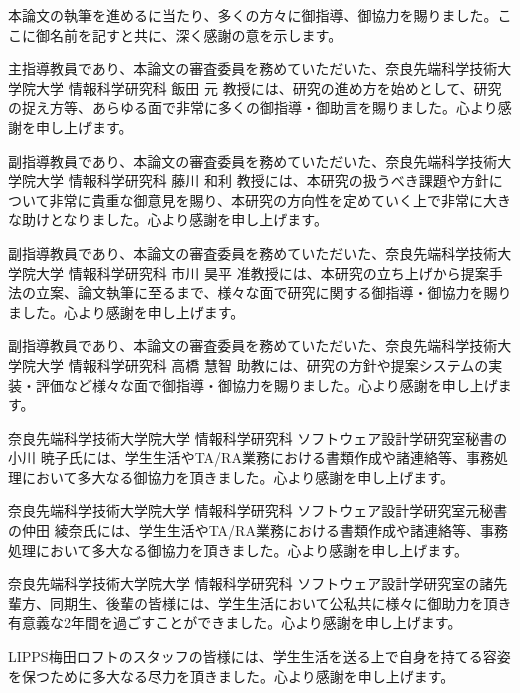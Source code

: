 本論文の執筆を進めるに当たり、多くの方々に御指導、御協力を賜りました。ここに御名前を記すと共に、深く感謝の意を示します。

主指導教員であり、本論文の審査委員を務めていただいた、奈良先端科学技術大学院大学 情報科学研究科 飯田 元 教授には、研究の進め方を始めとして、研究の捉え方等、あらゆる面で非常に多くの御指導・御助言を賜りました。心より感謝を申し上げます。

副指導教員であり、本論文の審査委員を務めていただいた、奈良先端科学技術大学院大学 情報科学研究科 藤川 和利 教授には、本研究の扱うべき課題や方針について非常に貴重な御意見を賜り、本研究の方向性を定めていく上で非常に大きな助けとなりました。心より感謝を申し上げます。

副指導教員であり、本論文の審査委員を務めていただいた、奈良先端科学技術大学院大学 情報科学研究科 市川 昊平 准教授には、本研究の立ち上げから提案手法の立案、論文執筆に至るまで、様々な面で研究に関する御指導・御協力を賜りました。心より感謝を申し上げます。

副指導教員であり、本論文の審査委員を務めていただいた、奈良先端科学技術大学院大学 情報科学研究科 高橋 慧智 助教には、研究の方針や提案システムの実装・評価など様々な面で御指導・御協力を賜りました。心より感謝を申し上げます。

奈良先端科学技術大学院大学 情報科学研究科 ソフトウェア設計学研究室秘書の小川 暁子氏には、学生生活やTA/RA業務における書類作成や諸連絡等、事務処理において多大なる御協力を頂きました。心より感謝を申し上げます。

奈良先端科学技術大学院大学 情報科学研究科 ソフトウェア設計学研究室元秘書の仲田 綾奈氏には、学生生活やTA/RA業務における書類作成や諸連絡等、事務処理において多大なる御協力を頂きました。心より感謝を申し上げます。

奈良先端科学技術大学院大学 情報科学研究科 ソフトウェア設計学研究室の諸先輩方、同期生、後輩の皆様には、学生生活において公私共に様々に御助力を頂き有意義な2年間を過ごすことができました。心より感謝を申し上げます。

LIPPS梅田ロフトのスタッフの皆様には、学生生活を送る上で自身を持てる容姿を保つために多大なる尽力を頂きました。心より感謝を申し上げます。